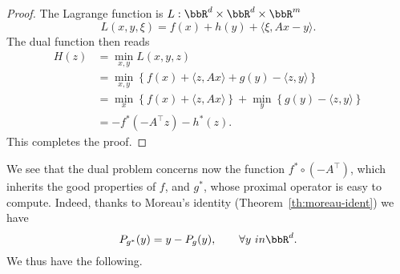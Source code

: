      \begin{proof}
         The Lagrange function is $L:\bbR^d\times\bbR^d\times \bbR^m$
         \begin{equation}
             L(x,y,\xi) = f(x)+h(y) +\langle \xi, Ax-y\rangle.
         \end{equation}
         The dual function then reads
         \begin{equation}
             \begin{aligned}
                 H(z)
                  & = \min_{x,y} L(x,y,z)                                                                    \\
                  & = \min_{x,y} \left\{ f(x) + \langle z, Ax \rangle + g(y) - \langle z, y \rangle \right\} \\
                  & = \min_{x} \left\{ f(x) + \langle z, Ax \rangle \right\}
                 + \min_{y} \left\{ g(y) - \langle z, y \rangle \right\}                                     \\
                  & = - f^*(-A^\top z) - h^*(z).
             \end{aligned}
         \end{equation}
         This completes the proof.
     \end{proof}
 
     We see that the dual problem concerns now the function $f^*\circ (-A^\top)$, which inherits the good properties of $f$, and $g^*$, whose proximal operator is easy to compute. Indeed, thanks to Moreau's identity (Theorem~\ref{th:moreau-ident}) we have
 \begin{equation}
     P_{g^*}(y) = y - P_g(y), \qquad \forall y\ in \bbR^d.
 \end{equation}
 We thus have the following.
 
 
